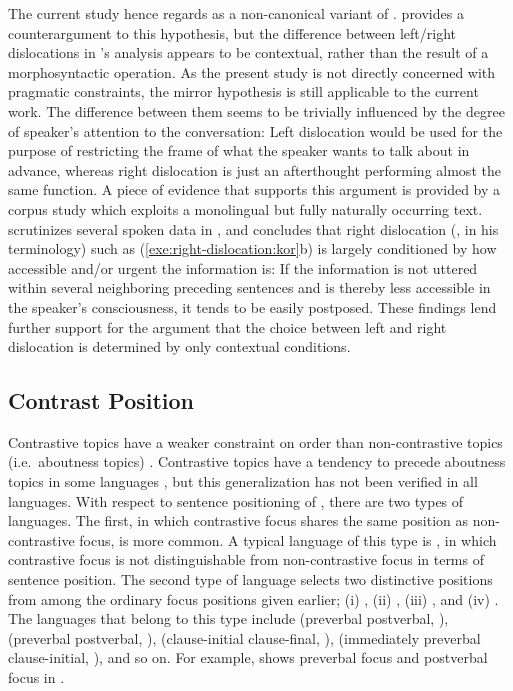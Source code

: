 The current study hence regards  as a
non-canonical variant of .  \citet{lambrecht:96}
provides a counterargument to this hypothesis, but the difference
between left/right dislocations in \citeauthor{lambrecht:96}'s
analysis appears to be contextual, rather than the result of a
morphosyntactic operation. As the present study is not directly
concerned with pragmatic constraints, the mirror hypothesis is still
applicable to the current work. The difference between them seems to
be trivially influenced by the degree of speaker's attention to the
conversation: Left dislocation would be used for the purpose of
restricting the frame of what the speaker wants to talk about in
advance, whereas right dislocation is just an afterthought performing
almost the same function. A piece of evidence that supports this
argument is provided by a corpus study which exploits a monolingual
but fully naturally occurring text. \citet{kim:11} scrutinizes several
spoken data in , and concludes that right dislocation
(, in his terminology) such as
(\ref{exe:right-dislocation:kor}b) is largely conditioned by how
accessible and/or urgent the information is: If the information is not
uttered within several neighboring preceding sentences and is thereby
less accessible in the speaker's consciousness, it tends to be easily
postposed. These findings lend further support for the argument that
the choice between left and right dislocation is determined by only
contextual conditions.



\subsection{Contrast Position}
\label{4:ssec:contrast-position}


Contrastive topics have a weaker constraint on order than
non-contrastive topics (i.e.\ aboutness topics)
\citep{erteschik:07,bianchi:frascarelli:10}. Contrastive topics have a
tendency to precede aboutness topics in some languages
\citep{bianchi:frascarelli:10}, but this generalization has not been
verified in all languages.  With respect to sentence positioning of
, there are two types of languages. The first, in
which contrastive focus shares the same position as non-contrastive
focus, is more common. A typical language of this type is , in
which contrastive focus is not distinguishable from non-contrastive
focus in terms of sentence position. The second type of language
selects two distinctive positions from among the ordinary focus
positions given earlier; (i) , (ii)
, (iii) , and (iv)
. The languages that belong to this type include
 (preverbal \vs postverbal,
\citep{skopeteas:fanselow:10}),  (preverbal \vs
postverbal, \citep{ambar:99}),  (clause-initial \vs
clause-final, \citep{neeleman:titov:09}),  (immediately
preverbal \vs clause-initial, \citep{nichols:11}), and so on.  For
example,  shows preverbal focus and postverbal
focus in .

